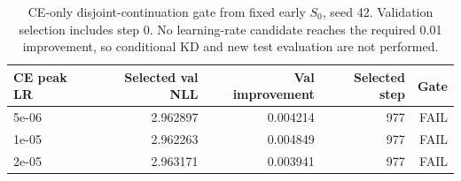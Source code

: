 \begin{table}[!t]
\centering
\begin{tabular}{lrrrr}
\toprule
CE peak LR & Selected val NLL & Val improvement & Selected step & Gate \\
\midrule
5e-06 & 2.962897 & 0.004214 & 977 & FAIL \\
1e-05 & 2.962263 & 0.004849 & 977 & FAIL \\
2e-05 & 2.963171 & 0.003941 & 977 & FAIL \\
\bottomrule
\end{tabular}
\caption{CE-only disjoint-continuation gate from fixed early $S_0$, seed 42. Validation selection includes step 0. No learning-rate candidate reaches the required 0.01 improvement, so conditional KD and new test evaluation are not performed.}
\label{tab:modern_ce_gate}
\end{table}
